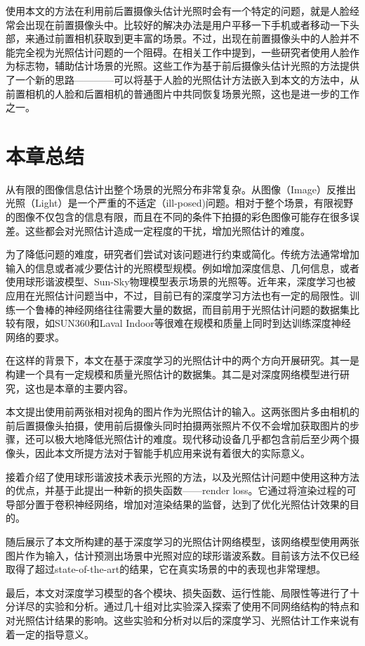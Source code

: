 使用本文的方法在利用前后置摄像头估计光照时会有一个特定的问题，就是人脸经常会出现在前置摄像头中。比较好的解决办法是用户平移一下手机或者移动一下头部，来通过前置相机获取到更丰富的场景。不过，出现在前置摄像头中的人脸并不能完全视为光照估计问题的一个阻碍。在相关工作中提到，一些研究者使用人脸作为标志物，辅助估计场景的光照。这些工作为基于前后摄像头估计光照的方法提供了一个新的思路————可以将基于人脸的光照估计方法嵌入到本文的方法中，从前置相机的人脸和后置相机的普通图片中共同恢复场景光照，这也是进一步的工作之一。
\section{本章总结}
从有限的图像信息估计出整个场景的光照分布非常复杂。从图像（Image）反推出光照（Light）是一个严重的不适定（ill-posed)问题。相对于整个场景，有限视野的图像不仅包含的信息有限，而且在不同的条件下拍摄的彩色图像可能存在很多误差。这些都会对光照估计造成一定程度的干扰，增加光照估计的难度。

为了降低问题的难度，研究者们尝试对该问题进行约束或简化。传统方法通常增加输入的信息或者减少要估计的光照模型规模。例如增加深度信息、几何信息，或者使用球形谐波模型、Sun-Sky物理模型表示场景的光照等。近年来，深度学习也被应用在光照估计问题当中，不过，目前已有的深度学习方法也有一定的局限性。训练一个鲁棒的神经网络往往需要大量的数据，而目前用于光照估计问题的数据集比较有限，如SUN360\cite{xiao2012recognizing}和Laval Indoor\cite{gardner2017learning}等很难在规模和质量上同时到达训练深度神经网络的要求。

在这样的背景下，本文在基于深度学习的光照估计中的两个方向开展研究。其一是构建一个具有一定规模和质量光照估计的数据集。其二是对深度网络模型进行研究，这也是本章的主要内容。

本文提出使用前两张相对视角的图片作为光照估计的输入。这两张图片多由相机的前后置摄像头拍摄，使用前后摄像头同时拍摄两张照片不仅不会增加获取图片的步骤，还可以极大地降低光照估计的难度。现代移动设备几乎都包含前后至少两个摄像头，因此本文所提方法对于智能手机应用来说有着很大的实际意义。

接着介绍了使用球形谐波技术表示光照的方法，以及光照估计问题中使用这种方法的优点，并基于此提出一种新的损失函数——render loss。它通过将渲染过程的可导部分置于卷积神经网络，增加对渲染结果的监督，达到了优化光照估计效果的目的。

随后展示了本文所构建的基于深度学习的光照估计网络模型，该网络模型使用两张图片作为输入，估计预测出场景中光照对应的球形谐波系数。目前该方法不仅已经取得了超过state-of-the-art的结果，它在真实场景的中的表现也非常理想。

最后，本文对深度学习模型的各个模块、损失函数、运行性能、局限性等进行了十分详尽的实验和分析。通过几十组对比实验深入探索了使用不同网络结构的特点和对光照估计结果的影响。这些实验和分析对以后的深度学习、光照估计工作来说有着一定的指导意义。